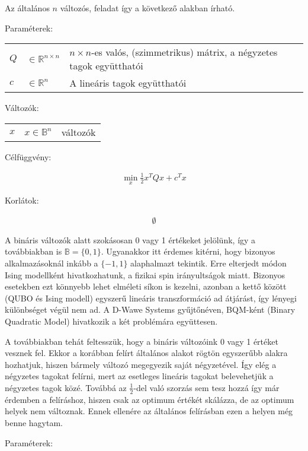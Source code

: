Az általános $n$ változós, feladat így a következő alakban írható.


Paraméterek:

\begin{tabular}{lll}
	$Q$ & $\in \mathbb{R}^{n×n}$  & $n × n$-es valós, (szimmetrikus) mátrix, a négyzetes tagok együtthatói \\
	$c$ & $\in \mathbb{R}^n$   & A lineáris tagok együtthatói \\
\end{tabular}

Változók:

\begin{tabular}{lll}
	$x$ & $x \in \mathbb{B}^n$ & változók \\
\end{tabular}

Célfüggvény:

\begin{align}
	\min_{x} \frac{1}{2} x^T Q x + c^T x 
\end{align}

Korlátok:

\begin{align}
	\emptyset
\end{align}

A bináris változók alatt szokásosan 0 vagy 1 értékeket jelölünk, így a továbbiakban is $\mathbb{B}=\{0,1\}$. Ugyanakkor itt érdemes kitérni, hogy bizonyos alkalmazásoknál inkább a $\{-1,1\}$ alaphalmazt tekintik. Erre elterjedt módon Ising modellként hivatkozhatunk, a fizikai spin irányultságok miatt. Bizonyos esetekben ezt könnyebb lehet elméleti síkon is kezelni, azonban a kettő között (QUBO és Ising modell) egyszerű lineáris transzformáció ad átjárást, így lényegi különbséget végül nem ad. A D-Wawe Systems gyűjtőnéven, BQM-ként (Binary Quadratic Model) hivatkozik a két problémára együttesen.

A továbbiakban tehát feltesszük, hogy a bináris változóink 0 vagy 1 értéket vesznek fel. Ekkor a korábban felírt általános alakot rögtön egyszerűbb alakra hozhatjuk, hiszen bármely változó megegyezik saját négyzetével. Így elég a négyzetes tagokat felírni, mert az esetleges lineáris tagokat belevehetjük a négyzetes tagok közé. Továbbá az $\frac{1}{2}$-del való szorzás sem tesz hozzá így már érdemben a felíráshoz, hiszen csak az optimum értékét skálázza, de az optimum helyek nem változnak. Ennek ellenére az általános felírásban ezen a helyen még benne hagytam.

Paraméterek:


